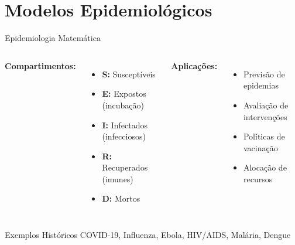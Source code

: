 \section{Modelos Epidemiológicos}

\begin{frame}{Epidemiologia Matemática}

\vspace{0.3cm}

\begin{columns}
\textbf{Compartimentos:}
\begin{itemize}
    \item \textbf{S:} Susceptíveis
    \item \textbf{E:} Expostos (incubação)
    \item \textbf{I:} Infectados (infecciosos)
    \item \textbf{R:} Recuperados (imunes)
    \item \textbf{D:} Mortos
\end{itemize}

\textbf{Aplicações:}
\begin{itemize}
    \item Previsão de epidemias
    \item Avaliação de intervenções
    \item Políticas de vacinação
    \item Alocação de recursos
\end{itemize}
\end{columns}

\vspace{0.3cm}

\begin{exampleblock}{Exemplos Históricos}
COVID-19, Influenza, Ebola, HIV/AIDS, Malária, Dengue
\end{exampleblock}
\end{frame}


